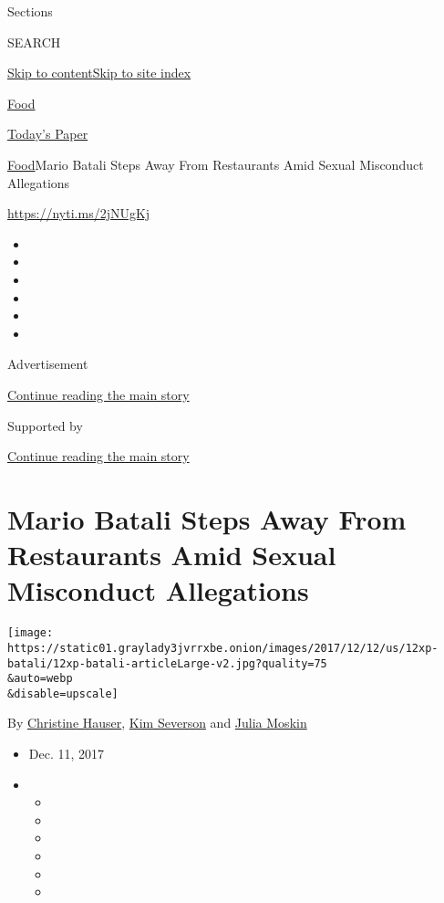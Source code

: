 Sections

SEARCH

\protect\hyperlink{site-content}{Skip to
content}\protect\hyperlink{site-index}{Skip to site index}

\href{https://www.nytimes3xbfgragh.onion/section/food}{Food}

\href{https://myaccount.nytimes3xbfgragh.onion/auth/login?response_type=cookie\&client_id=vi}{}

\href{https://www.nytimes3xbfgragh.onion/section/todayspaper}{Today's
Paper}

\href{/section/food}{Food}\textbar{}Mario Batali Steps Away From
Restaurants Amid Sexual Misconduct Allegations

\url{https://nyti.ms/2jNUgKj}

\begin{itemize}
\item
\item
\item
\item
\item
\item
\end{itemize}

Advertisement

\protect\hyperlink{after-top}{Continue reading the main story}

Supported by

\protect\hyperlink{after-sponsor}{Continue reading the main story}

\hypertarget{mario-batali-steps-away-from-restaurants-amid-sexual-misconduct-allegations}{%
\section{Mario Batali Steps Away From Restaurants Amid Sexual Misconduct
Allegations}\label{mario-batali-steps-away-from-restaurants-amid-sexual-misconduct-allegations}}

\texttt{[image: https://static01.graylady3jvrrxbe.onion/images/2017/12/12/us/12xp-batali/12xp-batali-articleLarge-v2.jpg?quality=75\\\&auto=webp\\\&disable=upscale]}

By
\href{http://www.nytimes3xbfgragh.onion/by/christine-hauser}{Christine
Hauser}, \href{http://www.nytimes3xbfgragh.onion/by/kim-severson}{Kim
Severson} and
\href{http://www.nytimes3xbfgragh.onion/by/julia-moskin}{Julia Moskin}

\begin{itemize}
\item
  Dec. 11, 2017
\item
  \begin{itemize}
  \item
  \item
  \item
  \item
  \item
  \item
  \end{itemize}
\end{itemize}

